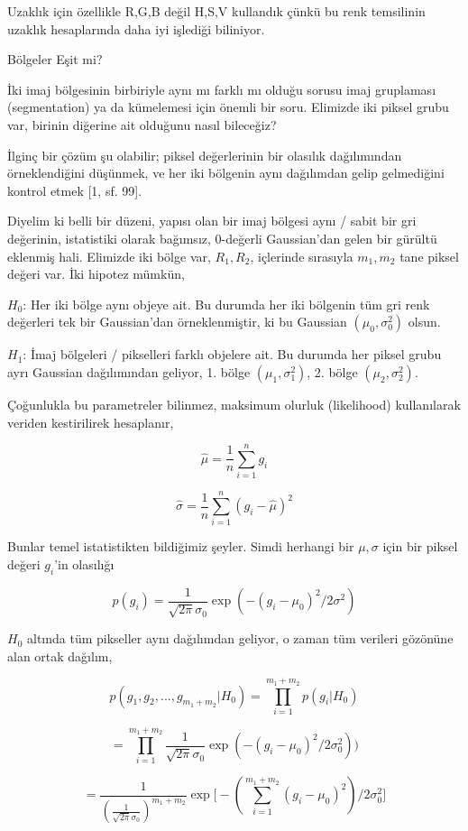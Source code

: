 \documentclass[12pt,fleqn]{article}\usepackage{../../common}
\begin{document}
Uzaklık için özellikle R,G,B değil H,S,V kullandık çünkü bu renk temsilinin
uzaklık hesaplarında daha iyi işlediği biliniyor. 

Bölgeler Eşit mi?

İki imaj bölgesinin birbiriyle aynı mı farklı mı olduğu sorusu imaj gruplaması
(segmentation) ya da kümelemesi için önemli bir soru. Elimizde iki piksel grubu
var, birinin diğerine ait olduğunu nasıl bileceğiz?

İlginç bir çözüm şu olabilir; piksel değerlerinin bir olasılık dağılımından
örneklendiğini düşünmek, ve her iki bölgenin aynı dağılımdan gelip gelmediğini
kontrol etmek [1, sf. 99].

Diyelim ki belli bir düzeni, yapısı olan bir imaj bölgesi aynı / sabit bir gri
değerinin, istatistiki olarak bağımsız, 0-değerli Gaussian'dan gelen bir gürültü
eklenmiş hali. Elimizde iki bölge var, $R_1,R_2$, içlerinde sırasıyla $m_1,m_2$
tane piksel değeri var. İki hipotez mümkün,

$H_0$: Her iki bölge aynı objeye ait. Bu durumda her iki bölgenin tüm gri renk
değerleri tek bir Gaussian'dan örneklenmiştir, ki bu Gaussian $(\mu_0,\sigma_0^2)$
olsun.

$H_1$: İmaj bölgeleri / pikselleri farklı objelere ait. Bu durumda her piksel
grubu ayrı Gaussian dağılımından geliyor, 1. bölge $(\mu_1,\sigma_1^2)$,
2. bölge $(\mu_2,\sigma_2^2)$.

Çoğunlukla bu parametreler bilinmez, maksimum olurluk (likelihood) kullanılarak
veriden kestirilirek hesaplanır,

$$ \hat{\mu} = \frac{1}{n} \sum _{i=1}^{n}g_i $$

$$ \hat{\sigma} = \frac{1}{n} \sum _{i=1}^{n} (g_i-\hat{\mu})^2 $$

Bunlar temel istatistikten bildiğimiz şeyler.  Simdi herhangi bir $\mu,\sigma$
için bir piksel değeri $g_i$'in olasılığı

$$ p(g_i) = \frac{1}{\sqrt{2\pi} \sigma_0} \exp (- (g_i-\mu_0)^2 / 2\sigma^2)  $$

$H_0$ altında tüm pikseller aynı dağılımdan geliyor, o zaman tüm verileri
gözönüne alan ortak dağılım,

$$ p(g_1,g_2,...,g_{m_1+m_2} | H_0) = \prod _{i=1}^{m_1+m_2} p(g_i|H_0)$$

$$
= \prod _{i=1}^{m_1+m_2} \frac{1}{\sqrt{2\pi} \sigma_0}
\exp (- (g_i-\mu_0)^2 / 2\sigma_0^2) )
$$

$$
= \frac{1}{ (\frac{1}{\sqrt{2\pi} \sigma_0})^{m_1+m_2} }
\exp \big[ - (\sum _{i=1}^{m_1 + m_2} (g_i-\mu_0)^2) / 2\sigma_0^2 \big]
$$
\end{document}
